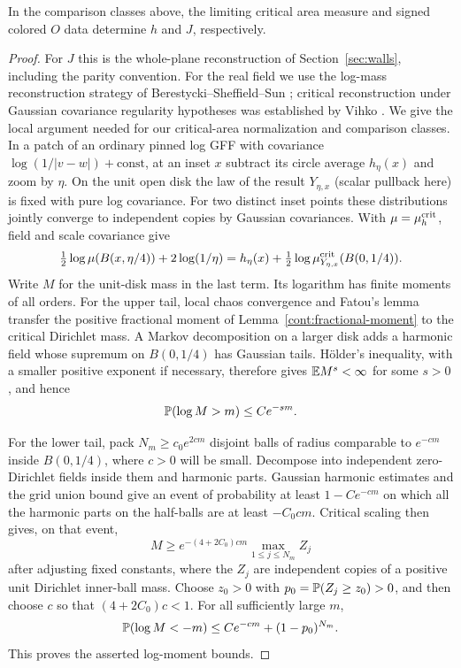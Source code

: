 \begin{lemma}\label{conf:field-reconstruction}
In the comparison classes above, the limiting critical area measure and signed colored \(O\) data
determine \(h\) and \(J\), respectively.
\end{lemma}
\begin{proof}

For \(J\) this is the whole-plane reconstruction of Section~\ref{sec:walls}, including the parity
convention. For the real field we use the log-mass reconstruction strategy
of Berestycki--Sheffield--Sun \citep[Section~2]{BSSReconstruction}; critical
reconstruction under Gaussian covariance regularity hypotheses was established
by Vihko \citep[Theorem~A]{VihkoReconstruction}.  We give the local argument
needed for our critical-area normalization and comparison classes. In a patch of an ordinary pinned log GFF
with covariance \(\log(1/|v-w|)+\mathrm{const}\), at an inset \(x\) subtract its circle average
\(h_\eta(x)\) and zoom by \(\eta\). On the unit open disk the law of the result \(Y_{\eta,x}\)
(scalar pullback here) is fixed with pure log covariance. For two distinct inset points these
distributions jointly converge to independent copies by Gaussian covariances. With \(\mu=\mu_h^{\rm
crit}\), field and scale covariance give
\[
 \tfrac12\log\mu(B(x,\eta/4))+2\log(1/\eta)
                =h_\eta(x)+\tfrac12\log\mu_{Y_{\eta,x}}^{\rm crit}(B(0,1/4)).
\]
Write \(M\) for the unit-disk mass in the last term. Its logarithm
has finite moments of all orders. For the upper tail, local chaos
convergence and Fatou's lemma transfer the positive fractional moment
of Lemma~\ref{cont:fractional-moment} to the critical Dirichlet mass.
A Markov decomposition on a larger disk adds a harmonic field whose
supremum on \(B(0,1/4)\) has Gaussian tails. H\"older's inequality,
with a smaller positive exponent if necessary, therefore gives
\(\mathbb E M^s<\infty\) for some \(s>0\), and hence
\[
                         \mathbb P(\log M>m)\le C e^{-sm}.
\]

For the lower tail, pack \(N_m\ge c_0e^{2cm}\) disjoint balls of
radius comparable to \(e^{-cm}\) inside \(B(0,1/4)\), where
\(c>0\) will be small. Decompose into independent zero-Dirichlet
fields inside them and harmonic parts. Gaussian harmonic estimates and
the grid union bound give an event of probability at least
\(1-Ce^{-cm}\) on which all the harmonic parts on the half-balls
are at least \(-C_0cm\). Critical scaling then gives, on that event,
\[
 M\ge e^{-(4+2C_0)cm}\max_{1\le j\le N_m} Z_j
\]
after adjusting fixed constants, where the \(Z_j\) are independent
copies of a positive unit Dirichlet inner-ball mass. Choose
\(z_0>0\) with \(p_0=\mathbb P(Z_j\ge z_0)>0\), and then choose
\(c\) so that \((4+2C_0)c<1\). For all sufficiently large \(m\),
\[
 \mathbb P(\log M<-m)
 \le Ce^{-cm}+(1-p_0)^{N_m}.
\]
This proves the asserted log-moment bounds.


\end{proof}
